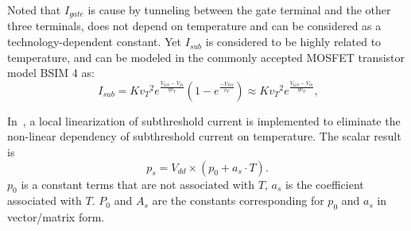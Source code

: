 Noted that $I_{gate}$ is cause by tunneling between the gate terminal and the other three terminals, does not depend on temperature and can be considered as a technology-dependent constant. Yet $I_{sub}$ is considered to be highly related to temperature, and can be modeled in the commonly accepted MOSFET transistor model BSIM 4 as:
\begin{equation}\label{eq:sub_current}\
I_{sub}=K {v_T}^2e^{\frac{V_{GS}-V_{th}}{\eta v_T}}
  (1-e^{\frac{-V_{DS}}{v_T}}) \approx K {v_T}^2e^{\frac{V_{GS}-V_{th}}{\eta v_T}},
\end{equation}

In~\cite{WangWan:TOC'18}, a local linearization of subthreshold current is implemented to eliminate the non-linear dependency of subthreshold current on temperature. The scalar result is
\begin{equation}\label{eq:lin_leakage}
p_{s} = V_{dd} \times (p_{0}+a_{s} \cdot T).
\end{equation}
$p_{0}$ is a constant terms that are not associated with $T$, $a_{s}$ is the coefficient associated with $T$. $P_{0}$ and $A_{s}$ are the constants corresponding for $p_{0}$ and $a_{s}$ in vector/matrix form.




